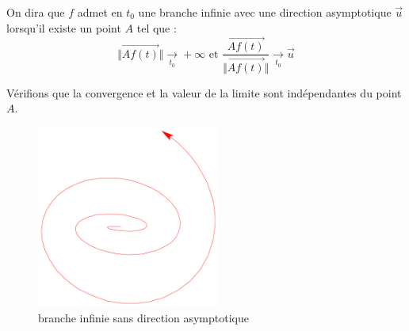 \begin{defi}
 On dira que $f$ admet en $t_0$ une branche infinie avec une direction asymptotique $\overrightarrow{u}$ lorsqu'il existe un point $A$ tel que :
\begin{displaymath}
 \Vert \overrightarrow{Af(t)}\Vert \xrightarrow[t_0]{} +\infty 
\text{ et }
 \dfrac{\overrightarrow{Af(t)}}{\Vert \overrightarrow{Af(t)}\Vert} \xrightarrow[t_0]{} \overrightarrow{u}
\end{displaymath}
\end{defi}
Vérifions que la convergence et la valeur de la limite sont indépendantes du point $A$.
\begin{figure}
 \begin{center}
  \includegraphics[width=6cm]{C6430_4.pdf}
\end{center}
\caption{branche infinie sans direction asymptotique}
\end{figure}

